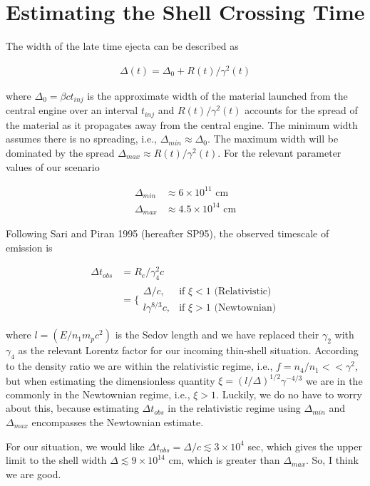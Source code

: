 \documentclass[linenumbers,twocolumn]{aastex631}
\begin{document}
\section{Estimating the Shell Crossing Time}
{
    The width of the late time ejecta can be described as

    \begin{align}
        \Delta(t) = \Delta_0 + R(t)/\gamma^2(t)
    \end{align}

    where $\Delta_0 = \beta c t_{inj}$ is the approximate width of the material launched from the central engine over an interval $t_{inj}$ and $R(t)/\gamma^2(t)$ accounts for the spread of the material as it propagates away from the central engine. The minimum width assumes there is no spreading, i.e., $\Delta_{min} \approx \Delta_0$. The maximum width will be dominated by the spread $\Delta_{max}\approx R(t)/\gamma^2(t)$. For the relevant parameter values of our scenario

    \begin{align}
        \Delta_{min} &\approx 6\times10^{11} \text{ cm}\\
        \Delta_{max} &\approx 4.5\times10^{14} \text{ cm}
    \end{align}

    Following Sari and Piran 1995 (hereafter SP95), the observed timescale of emission is

    \begin{align}
        \Delta t_{obs} &= R_e / \gamma^2_4c \label{eq: t_obs} \\
        &= \bigg\{ \begin{array}{ll}
            \Delta/c, & \text{if } \xi < 1\text{ (Relativistic)}\\
            l\gamma^{8/3}c, & \text{if } \xi > 1 \text{ (Newtownian)}
        \end{array}
    \end{align}

    where $l = (E/n_1 m_p c^2)$ is the Sedov length and we have replaced their $\gamma_2$ with $\gamma_4$ as the relevant Lorentz factor for our incoming thin-shell situation. According to the density ratio we are within the relativistic regime, i.e., $f = n_4/n_1 << \gamma^2$, but when estimating the dimensionless quantity $\xi = (l/\Delta)^{1/2} \gamma^{-4/3}$ we are in the commonly in the Newtownian regime, i.e., $\xi > 1$. Luckily, we do no have to worry about this, because estimating $\Delta t_{obs}$ in the relativistic regime using $\Delta_{min}$ and $\Delta_{max}$ encompasses the Newtownian estimate.

    For our situation, we would like $\Delta t_{obs} = \Delta/c \lesssim 3\times10^4$ sec, which gives the upper limit to the shell width $\Delta \lesssim 9\times10^{14}$ cm, which is greater than $\Delta_{max}$. So, I think we are good. 
}
\end{document}
